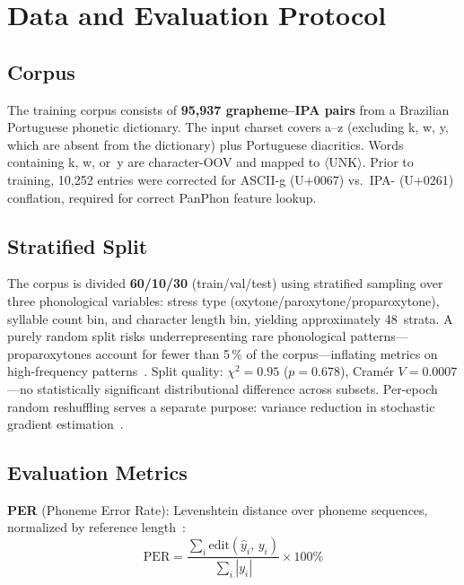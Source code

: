 \documentclass[conference]{IEEEtran}
\begin{document}
\section{Data and Evaluation Protocol}
\label{sec:data}

\subsection{Corpus}

The training corpus consists of \textbf{95{,}937 grapheme--IPA pairs}
from a Brazilian Portuguese phonetic dictionary.
The input charset covers a--z (excluding k, w, y, which are absent
from the dictionary) plus Portuguese diacritics.
Words containing k, w, or~y are character-OOV and mapped to
$\langle$UNK$\rangle$.
Prior to training, 10{,}252 entries were corrected for ASCII-g
(U+0067) vs.\ IPA- (U+0261) conflation, required for
correct PanPhon feature lookup.

\subsection{Stratified Split}

The corpus is divided \textbf{60/10/30} (train/val/test) using
stratified sampling over three phonological variables: stress type
(oxy\-tone/paroxytone/proparoxytone), syllable count bin, and
character length bin, yielding approximately 48~strata.
A purely random split risks underrepresenting rare phonological
patterns---proparoxytones account for fewer than 5\,\% of the
corpus---inflating metrics on high-frequency
patterns~\cite{kohavi1995crossvalidation}.
Split quality: $\chi^2\!=\!0.95$ ($p\!=\!0.678$),
Cram\'{e}r $V\!=\!0.0007$---no statistically significant
distributional difference across subsets.
Per-epoch random reshuffling serves a separate purpose: variance
reduction in stochastic gradient estimation~\cite{bottou2010large}.

\subsection{Evaluation Metrics}

\textbf{PER} (Phoneme Error Rate): Levenshtein distance over phoneme
sequences, normalized by reference length~\cite{bisani2008joint}:
\begin{equation}
  \mathrm{PER} = \frac{\displaystyle\sum_i \mathrm{edit}(\hat{y}_i,\,
                 y_i)}{\displaystyle\sum_i |y_i|} \times 100\%
  \label{eq:per}
\end{equation}
\end{document}

